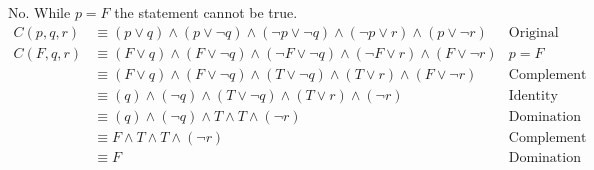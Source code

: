 \documentclass[draft]{article}
\begin{document}
\subsection{}
No. While $p=F$ the statement cannot be true.
\begin{align*}
    C(p, q, r) & \equiv (p \lor q) \land (p \lor \neg q) \land ( \neg p \lor \neg q) \land ( \neg p \lor r) \land (p \lor \neg r) & \text{Original proposition}& \\
    C(F, q, r) & \equiv (F \lor q) \land (F \lor \neg q) \land ( \neg F \lor \neg q) \land ( \neg F \lor r) \land (F \lor \neg r) & p = F\\
    & \equiv (F \lor q) \land (F \lor \neg q) \land ( T \lor \neg q) \land ( T \lor r) \land (F \lor \neg r) & \text{Complement Laws} & \\
    & \equiv (q) \land (\neg q) \land ( T \lor \neg q) \land ( T \lor r) \land (\neg r) & \text{Identity laws} &\\
    & \equiv (q) \land (\neg q) \land T \land T \land (\neg r) & \text{Domination laws} &\\
    & \equiv F \land T \land T \land (\neg r) & \text{Complement law} &\\
    & \equiv F & \text{Domination laws} &
\end{align*}
\end{document}
